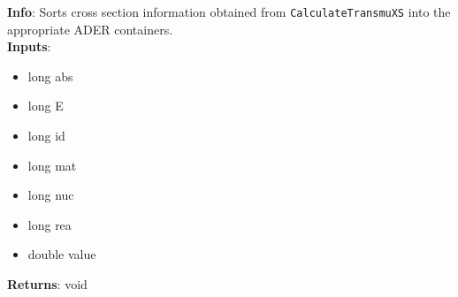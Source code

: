 \textbf{Info}: Sorts cross section information obtained from
\texttt{CalculateTransmuXS} into the appropriate ADER containers. \\

\noindent \textbf{Inputs}:
    \begin{itemize}
        \item{long abs}
        \item{long E}
        \item{long id}
        \item{long mat}
        \item{long nuc}
        \item{long rea}
        \item{double value}
    \end{itemize} 

\noindent \textbf{Returns}: void
